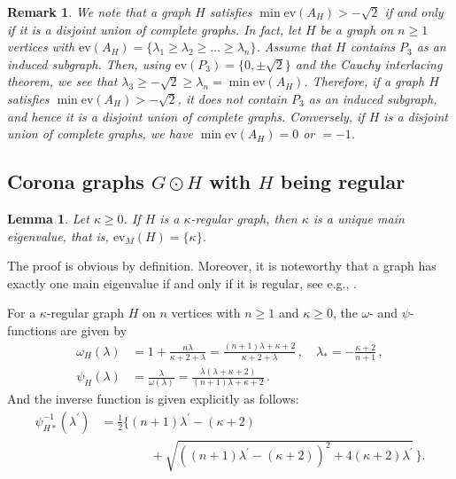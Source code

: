 \documentclass[12pt,a4paper]{article}
\newtheorem{lemma}[theorem]{Lemma}
\newtheorem{remark}[theorem]{Remark}
\newcommand{\1}{{\bm 1}}
\numberwithin{equation}{section}
\begin{document}
\begin{remark}\normalfont
We note that a graph $H$ satisfies $\min \mathrm{ev}(A_H)>-\sqrt{2}$
if and only if it is a disjoint union of complete graphs.
In fact, let $H$ be a graph on $n\ge1$ vertices
with $\mathrm{ev}(A_H)=\{\lambda_1\ge \lambda_2\ge
\dots\ge \lambda_n\}$.
Assume that $H$ contains $P_3$ as an induced subgraph.
Then, using $\mathrm{ev}(P_3)=\{0,\pm\sqrt2\}$
and the Cauchy interlacing theorem,
we see that $\lambda_3\ge -\sqrt2 \ge \lambda_n=\min\mathrm{ev}(A_H)$.
Therefore, if a graph $H$ satisfies
$\min \mathrm{ev}(A_H)>-\sqrt{2}$,
it does not contain $P_3$ as an induced subgraph,
and hence it is a disjoint union of complete graphs.
Conversely, if $H$ is a disjoint union of complete graphs,
we have $\min\mathrm{ev}(A_H)=0$ or $=-1$.
\end{remark}


\subsection{Corona graphs $G\odot H$ with $H$ being regular}
\label{04subsec:Formula for QEC of corona graph with regular H}

\begin{lemma}\label{04lem:main ev for regular graphs}
Let $\kappa\ge0$.
If $H$ is a $\kappa$-regular graph,
then $\kappa$ is a unique main eigenvalue, that is,
$\mathrm{ev}_M(H)=\{\kappa\}$.
\end{lemma}

The proof is obvious by definition.
Moreover, it is noteworthy that
a graph has exactly one main eigenvalue if and only if it 
is regular, see e.g., \cite{Cvetkovic1978,Cvetkovic-Rowlinson-Simic2010}.

For a $\kappa$-regular graph $H$ on $n$ vertices
with $n\ge1$ and $\kappa\ge0$,
the $\omega$- and $\psi$-functions are given by
%
\begin{align}
\omega_H(\lambda)
&=1+\frac{n\lambda}{\kappa+2+\lambda}
=\frac{(n+1)\lambda+\kappa+2}{\kappa+2+\lambda}\,,
\quad
\lambda_*=-\frac{\kappa+2}{n+1}\,,
\label{04eqn:lambda* for regular graphs}
\\[6pt]
\psi_H(\lambda)
&=\frac{\lambda}{\omega(\lambda)}
=\frac{\lambda(\lambda+\kappa+2)}{(n+1)\lambda+\kappa+2}\,.
\label{04eqn:psi for regular graphs}
\end{align}
And the inverse function is given explicitly as follows:
%
\begin{align}
\psi_{H*}^{-1}(\lambda^\prime)
&=\frac{1}{2}\Big\{(n+1)\lambda^\prime-(\kappa+2)
\nonumber\\
&\qquad\qquad +\sqrt{
 ((n+1)\lambda^\prime-(\kappa+2))^2+4(\kappa+2)\lambda^\prime}\, \Big\}.
\label{03eqn:psi_H* inverse for regular graphs}
\end{align}
\end{document}
